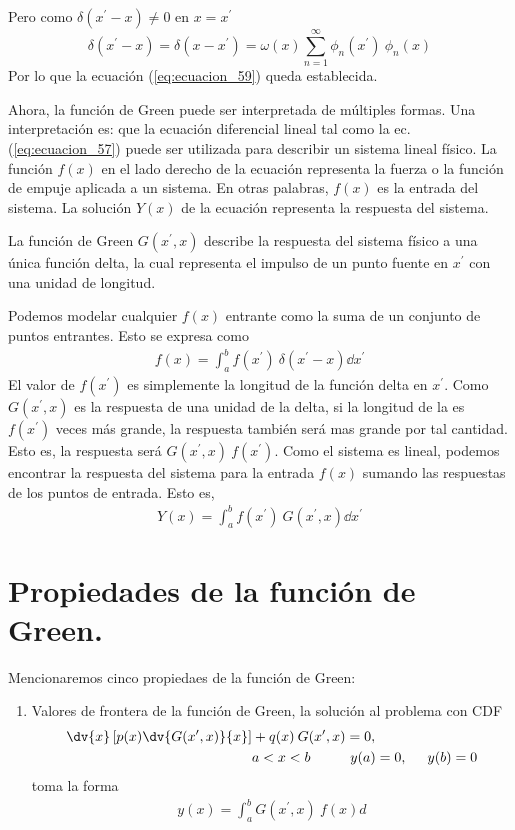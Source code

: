 Pero como $\delta (x^{\prime} - x) \neq 0$ en $x = x^{\prime}$
\begin{equation}
\delta (x^{\prime} - x) = \delta (x - x^{\prime}) = \omega (x) \sum_{n=1}^{\infty} \phi_{n}(x^{\prime}) \: \phi_{n}(x)
\label{eq:ecuacion_60}
\end{equation}
Por lo que la ecuación (\ref{eq:ecuacion_59}) queda establecida.
\par
Ahora, la función de Green puede ser interpretada de múltiples formas. Una interpretación es: que la ecuación diferencial lineal tal como la ec. (\ref{eq:ecuacion_57}) puede ser utilizada para describir un sistema lineal físico. La función $f(x)$ en el lado derecho de la ecuación representa la fuerza o la función de empuje aplicada a un sistema. En otras palabras, $f(x)$ es la entrada del sistema. La solución $Y(x)$ de la ecuación representa la respuesta del sistema.
\par
La función de Green $G(x^{\prime}, x)$ describe la respuesta del sistema físico a una única función delta, la cual representa el impulso de un punto fuente en $x^{\prime}$ con una unidad de longitud.
\par
Podemos modelar cualquier $f(x)$ entrante como la suma de un conjunto de puntos entrantes. Esto se expresa como
\begin{align*}
f(x) = \int_{a}^{b} f(x^{\prime}) \: \delta (x^{\prime} - x) \dd{x^{\prime}}
\end{align*}
El valor de $f(x^{\prime})$ es simplemente la longitud de la función delta en $x^{\prime}$. Como $G(x^{\prime}, x)$ es la respuesta de una unidad de la delta, si la longitud de la es $f(x^{\prime})$ veces más grande, la respuesta también será mas grande por tal cantidad. Esto es, la respuesta será $G(x^{\prime}, x) \: f(x^{\prime})$. Como el sistema es lineal, podemos encontrar la respuesta del sistema para la entrada $f(x)$ sumando las respuestas de los puntos de entrada. Esto es,
\begin{align*}
Y(x) = \int_{a}^{b} f(x^{\prime}) \: G(x^{\prime}, x) \dd{x^{\prime}}
\end{align*}
\newpage
\section{Propiedades de la función de Green.}
Mencionaremos cinco propiedaes de la función de Green:
\begin{enumerate}
\item Valores de frontera de la función de Green, la solución al problema con CDF
\begin{align*}
\dv{x} \left[p(x) \dv{G(x^{\prime}, x)}{x} \right] &+ q(x) \: G(x^{\prime}, x) = 0, \\
& a < x < b \hspace{1cm} y(a) = 0, \hspace{0.5cm} y(b) = 0
\end{align*}
toma la forma
\begin{align*}
y(x) = \int_{a}^{b} G(x^{\prime}, x) \: f(x) d
\end{align*}
\end{enumerate}
